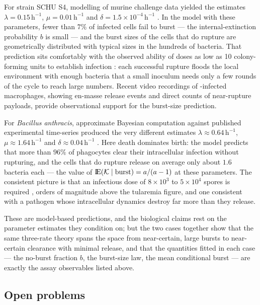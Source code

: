 For \ft{} strain SCHU S4, modelling of murine challenge data yielded the
estimates $\lambda=0.15\,\mathrm{h}^{-1}$,
$\mu=0.01\,\mathrm{h}^{-1}$ and
$\delta=1.5\times10^{-4}\,\mathrm{h}^{-1}$
\cite{carruthers2020stochastic}. In the model with these parameters, fewer
than $7\%$ of infected cells fail to burst --- the internal-extinction
probability $b$ is small --- and the burst sizes of the cells that do
rupture are geometrically distributed with typical sizes in the hundreds of
bacteria. That prediction sits comfortably with the observed ability of
doses as low as 10 colony-forming units to establish infection
\cite{oyston2004tularaemia}: each successful rupture floods the local
environment with enough bacteria that a small inoculum needs only a few
rounds of the cycle to reach large numbers. Recent video recordings of
\ft{}-infected macrophages, showing en-masse release events and direct
counts of near-rupture payloads, provide observational support for the
burst-size prediction.

For \textit{Bacillus anthracis}, approximate Bayesian computation against
published experimental time-series produced the very different estimates
$\lambda\approx0.64\,\mathrm{h}^{-1}$,
$\mu\approx1.64\,\mathrm{h}^{-1}$ and
$\delta\approx0.04\,\mathrm{h}^{-1}$ \cite{williams2021anthrax}. Here
death dominates birth: the model predicts that more than $96\%$ of
phagocytes clear their intracellular infection without rupturing, and the
cells that do rupture release on average only about $1.6$ bacteria each ---
the value of ${\rm I}\!{\rm E}(\mathcal{K}\mid\text{burst})=a/(a-1)$ at these parameters. The
consistent picture is that an infectious dose of $8\times10^3$ to
$5\times10^4$ spores is required \cite{williams2021anthrax}, orders of
magnitude above the tularemia figure, and one consistent with a pathogen
whose intracellular dynamics destroy far more than they release.

These are model-based predictions, and the biological claims rest on the
parameter estimates they condition on; but the two cases together show that
the same three-rate theory spans the space from near-certain, large bursts
to near-certain clearance with minimal release, and that the quantities
fitted in each case --- the no-burst fraction $b$, the burst-size law, the
mean conditional burst --- are exactly the assay observables listed above.

\subsection{Open problems}
\label{sec:open-problems}

